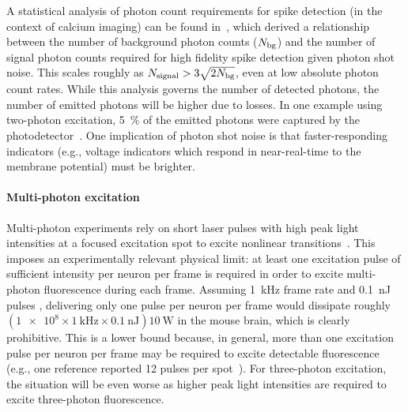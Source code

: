 A statistical analysis of photon count requirements for spike detection (in the context of calcium imaging) can be found in~\cite{wilt13}, which derived a relationship between the number of background photon counts ($N_{\text{\scriptsize bg}}$) and the number of signal photon counts required for high fidelity spike detection given photon shot noise. This scales roughly as $N_{\text{\scriptsize signal}} > 3\sqrt{2N_{\text{\scriptsize bg}}}$, even at low absolute photon count rates.
While this analysis governs the number of detected photons, the number of emitted photons will be higher due to losses.
In one example using two-photon excitation, \SI{5}{\percent} of the emitted photons were captured by the photodetector~\cite{kim99}. One implication of photon shot noise is that faster-responding indicators (e.g., voltage indicators which respond in near-real-time to the membrane potential) must be brighter.

\paragraph{Multi-photon excitation}

Multi-photon experiments rely on short laser pulses with high peak light intensities at a focused excitation spot to excite nonlinear transitions~\cite{kim99}.
This imposes an experimentally relevant physical limit: at least one excitation pulse of sufficient intensity per neuron per frame is required in order to excite multi-photon fluorescence during each frame.
Assuming \SI{1}{\kilo\hertz} frame rate and \SI{0.1}{\nano\joule} pulses \cite{cheng2011simultaneous}, delivering only one pulse per neuron per frame would dissipate roughly $\left(\num{1e8}\times\SI{1}{\kilo\hertz}\times\SI{0.1}{\nano\joule}\right) \SI{10}{\watt}$ in the mouse brain, which is clearly prohibitive.
This is a lower bound because, in general, more than one excitation pulse per neuron per frame may be required to excite detectable fluorescence (e.g., one reference reported 12 pulses per spot~\cite{kim99}).
For three-photon excitation, the situation will be even worse as higher peak light intensities are required to excite three-photon fluorescence. 

